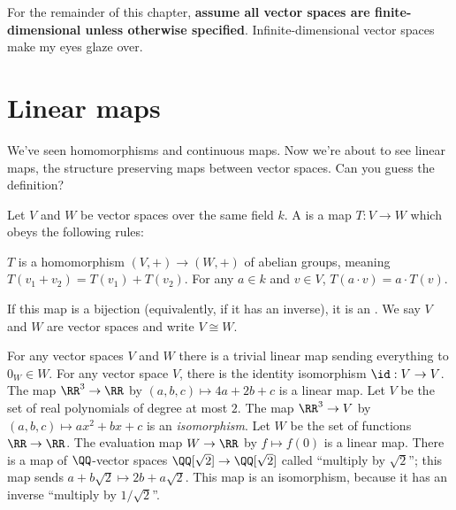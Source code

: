 For the remainder of this chapter,
\textbf{assume all vector spaces are finite-dimensional
unless otherwise specified}.
Infinite-dimensional vector spaces make my eyes glaze over.

\section{Linear maps}
We've seen homomorphisms and continuous maps.
Now we're about to see linear maps, the structure preserving maps
between vector spaces. Can you guess the definition?

\begin{definition}
	Let $V$ and $W$ be vector spaces over the same field $k$.
	A  is a map $T : V \to W$ which obeys the following rules:
	\begin{enumerate}[(i)]
		\ii $T$ is a homomorphism $(V,+) \to (W,+)$ of abelian groups, meaning $T(v_1 + v_2) = T(v_1) + T(v_2)$.
		\ii For any $a \in k$ and $v \in V$, $T(a \cdot v) = a \cdot T(v)$.
	\end{enumerate}
	If this map is a bijection (equivalently, if it has an inverse),
	it is an .
	We say $V$ and $W$ are  vector spaces and write $V \cong W$.
\end{definition}

\begin{example}
	\listhack
	\begin{enumerate}[(a)]
		\ii For any vector spaces $V$ and $W$ there is a trivial linear map sending everything to $0_W \in W$.
		\ii For any vector space $V$, there is the identity isomorphism $\id : V \to V$.
		\ii The map $\RR^3 \to \RR$ by $(a,b,c) \mapsto 4a+2b+c$ is a linear map.
		\ii Let $V$ be the set of real polynomials of degree at most $2$.
		The map $\RR^3 \to V$ by $(a,b,c) \mapsto ax^2+bx+c$ is an \emph{isomorphism}.
		\ii Let $W$ be the set of functions $\RR \to \RR$.
		The evaluation map $W \to \RR$ by $f \mapsto f(0)$ is a linear map.
		\ii There is a map of $\QQ$-vector spaces $\QQ[\sqrt2] \to \QQ[\sqrt2]$
		called ``multiply by $\sqrt2$''; this map sends $a+b\sqrt2 \mapsto 2b + a\sqrt2$.
		This map is an isomorphism, because it has an inverse ``multiply by $1/\sqrt2$''.
	\end{enumerate}
\end{example}

